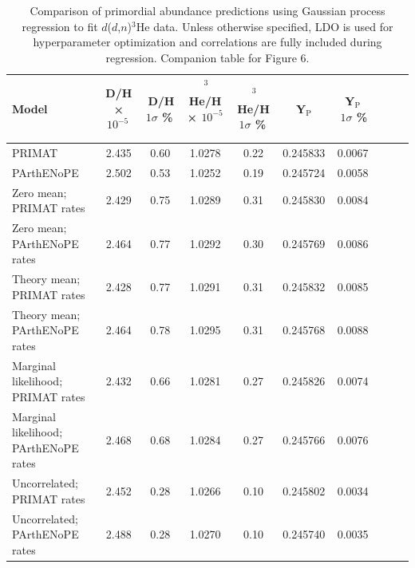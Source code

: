 \documentclass[%
 reprint,
superscriptaddress,
nofootinbib,
 amsmath,amssymb,
 aps,
 pra,
]{revtex4-2}
\begin{document}
\begin{table}[ht]
    \centering
    \caption{Comparison of primordial abundance predictions using Gaussian process regression to fit $d$($d$,$n$)$^3$He data. Unless otherwise specified, LDO is used for hyperparameter optimization and correlations are fully included during regression. Companion table for Figure 6.}
    \small
    \begin{tabular}{l
                    S[table-format=1.6]
                    S[table-format=1.5]
                    S[table-format=1.3]
                    S[table-format=1.6]
                    S[table-format=1.5]
                    S[table-format=1.3]
                    S[table-format=1.6]
                    S[table-format=1.7]
                    S[table-format=1.4]} 
     \toprule
    {Model} & {D/H × $10^{-5}$\,} & {\,D/H $1\sigma$ \%\,} &
    {\,$^3$He/H × $10^{-5}$\,} & {\,$^3$He/H $1\sigma$ \%\,} &
    {\,Y$_\text{P}$\,} & {\,Y$_\text{P}\,$ $\,1\sigma$ \%} \\
    \midrule
    PRIMAT & 2.435 & 0.60 & 1.0278 & 0.22 & 0.245833 & 0.0067 \\
    PArthENoPE & 2.502 & 0.53 & 1.0252 & 0.19 & 0.245724 & 0.0058 \\
    Zero mean; PRIMAT rates & 2.429 & 0.75 & 1.0289 & 0.31 & 0.245830 & 0.0084 \\
    Zero mean; PArthENoPE rates & 2.464 & 0.77 & 1.0292 & 0.30 & 0.245769 & 0.0086 \\
    Theory mean; PRIMAT rates & 2.428 & 0.77 & 1.0291 & 0.31 & 0.245832 & 0.0085 \\
    Theory mean; PArthENoPE rates & 2.464 & 0.78 & 1.0295 & 0.31 & 0.245768 & 0.0088 \\
    Marginal likelihood; PRIMAT rates & 2.432 & 0.66 & 1.0281 & 0.27 & 0.245826 & 0.0074 \\
    Marginal likelihood; PArthENoPE rates & 2.468 & 0.68 & 1.0284 & 0.27 & 0.245766 & 0.0076 \\
    Uncorrelated; PRIMAT rates & 2.452 & 0.28 & 1.0266 & 0.10 & 0.245802 & 0.0034 \\
    Uncorrelated; PArthENoPE rates & 2.488 & 0.28 & 1.0270 & 0.10 & 0.245740 & 0.0035 \\
    \bottomrule
    \end{tabular}
\end{table}
\end{document}
